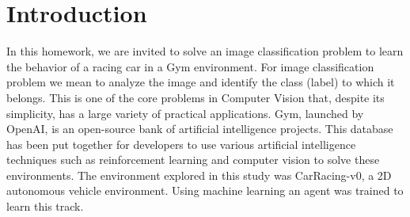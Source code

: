 \section{Introduction}
In this homework, we are invited to solve an image classification problem to learn the behavior of a racing car in a Gym environment. For image classification problem we mean to analyze the image and identify the class (label) to which it belongs. This is one of the core problems in Computer Vision that, despite its simplicity, has a large variety of practical applications. Gym, launched by OpenAI, is an open-source bank of artificial intelligence projects. This database has been put together for developers to use various artificial intelligence techniques such as reinforcement learning and computer vision to solve these environments. The environment explored in this study was CarRacing-v0, a 2D autonomous vehicle environment. Using machine learning an agent was trained to learn this track.
